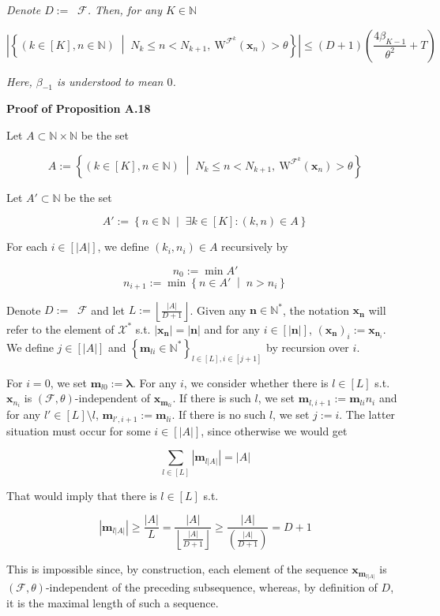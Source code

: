 \documentclass[a4paper]{article}
\newcommand{\Co}[1]{}
\newcommand{\AP}[1]{\left(#1\right)}
\newcommand{\AB}[1]{\left[#1\right]}
\newcommand{\AC}[1]{\left\{#1\right\}}
\newcommand{\ACM}[2]{\left\{#1\;\middle\vert\;#2\right\}}
\newcommand{\Abs}[1]{\left\vert #1 \right\vert}
\newcommand{\Floor}[1]{\left\lfloor #1 \right\rfloor}
\newcommand{\Nats}{\mathbb{N}}
\newcommand{\Estr}{\boldsymbol{\lambda}} %
\DeclareMathOperator{\RVO}{\dim_{RVO}}
\newcommand{\X}{\mathcal{X}}
\newcommand{\F}{\mathcal{F}}
\newcommand{\W}{\mathrm{W}}
\begin{document}
\textit{Denote $D:=\RVO\F$. Then, for any $K\in\Nats$}\Co{i}

$$\Abs{\ACM{\AP{k\in[K],n\in\Nats}}{N_k\leq n<N_{k+1},\ \W^{\F^{k}}\AP{\boldsymbol{x}_{n}}>\theta}}\leq(D+1)\AP{\frac{4\beta_{K-1}}{\theta^{2}}+T}$$

\textit{Here, $\beta_{-1}$ is understood to mean $0$.}\Co{i}

\textbf{Proof of Proposition A.18}\Co{b}

Let $A\subset\Nats\times\Nats$ be the set

$$A:=\ACM{\AP{k\in[K],n\in\Nats}}{N_k\leq n<N_{k+1},\ \W^{\F^{k}}\AP{\boldsymbol{x}_{n}}>\theta}$$

Let $A'\subset\Nats$ be the set

$$A':=\ACM{n\in\Nats}{\exists k\in[K]:(k,n)\in A}$$

For each $i\in\AB{\Abs{A}}$, we define $\AP{k_i,n_i}\in A$ recursively by

$$n_0:=\min A'$$
$$n_{i+1}:=\min\ACM{n\in A'}{n > n_i}$$

Denote $D:=\RVO{\F}$ and let $L:=\Floor{\frac{\Abs{A}}{D+1}}$. Given any $\boldsymbol{n}\in\Nats^*$, the notation $\boldsymbol{x}_{\boldsymbol{n}}$ will refer to the element of $\X^*$ s.t. $\Abs{\boldsymbol{x}_{\boldsymbol{n}}}=\Abs{\boldsymbol{n}}$ and for any $i\in\AB{\Abs{\boldsymbol{n}}}$, $\AP{\boldsymbol{x}_{\boldsymbol{n}}}_i:=\boldsymbol{x}_{\boldsymbol{n}_i}$. We define $j\in\AB{\Abs{A}}$ and $\AC{\boldsymbol{m}_{li}\in \Nats^*}_{l\in[L],i\in\AB{j+1}}$ by recursion over $i$.

For $i=0$, we set $\boldsymbol{m}_{l0}:=\Estr$. For any $i$, we consider whether there is $l\in[L]$ s.t. $\boldsymbol{x}_{n_i}$ is $(\F,\theta)$-independent of $\boldsymbol{x}_{\boldsymbol{m}_{li}}$. If there is such $l$, we set $\boldsymbol{m}_{l,i+1}:=\boldsymbol{m}_{li}{n_i}$ and for any $l'\in[L]\setminus l$, $\boldsymbol{m}_{l',i+1}:=\boldsymbol{m}_{li}$. If there is no such $l$, we set $j:=i$. The latter situation must occur for some $i\in\AB{\Abs{A}}$, since otherwise we would get

$$\sum_{l\in[L]}\Abs{\boldsymbol{m}_{l\Abs{A}}}=\Abs{A}$$

That would imply that there is $l\in[L]$ s.t.

$$\Abs{\boldsymbol{m}_{l\Abs{A}}}\geq\frac{\Abs{A}}{L}=\frac{\Abs{A}}{\Floor{\frac{\Abs{A}}{D+1}}}\geq\frac{\Abs{A}}{\AP{\frac{\Abs{A}}{D+1}}}=D+1$$

This is impossible since, by construction, each element of the sequence $\boldsymbol{x}_{\boldsymbol{m}_{l\Abs{A}}}$ is $(\F,\theta)$-independent of the preceding subsequence, whereas, by definition of $D$, it is the maximal length of such a sequence.
\end{document}
